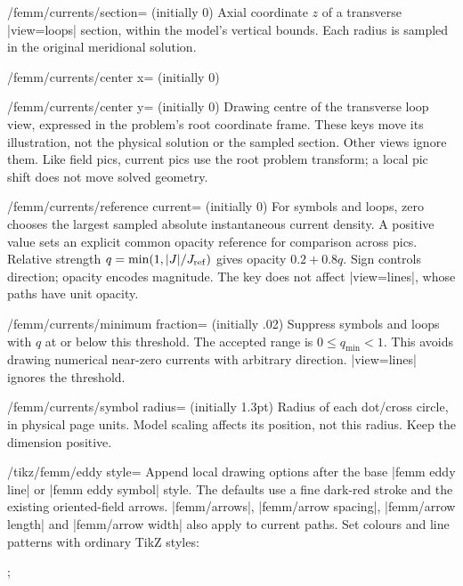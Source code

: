\begin{key}{/femm/currents/section= (initially 0)}
Axial coordinate $z$ of a transverse |view=loops| section, within the model's
vertical bounds. Each radius is sampled in the original meridional solution.
\end{key}
\begin{key}{/femm/currents/center x= (initially 0)}
\end{key}
\begin{key}{/femm/currents/center y= (initially 0)}
Drawing centre of the transverse loop view, expressed in the problem's root
coordinate frame. These keys move its illustration, not the physical solution
or the sampled section. Other views ignore them. Like field pics, current pics
use the root problem transform; a local pic shift does not move solved geometry.
\end{key}
\begin{key}{/femm/currents/reference current= (initially 0)}
For symbols and loops, zero chooses the largest sampled absolute instantaneous
current density. A positive value sets an explicit common opacity reference
for comparison across pics. Relative strength $q=\min(1,|J|/J_{\rm ref})$
gives opacity $0.2+0.8q$. Sign controls direction; opacity encodes magnitude.
The key does not affect |view=lines|, whose paths have unit opacity.
\end{key}
\begin{key}{/femm/currents/minimum fraction= (initially .02)}
Suppress symbols and loops with $q$ at or below this threshold. The accepted
range is $0\leq q_{\min}<1$. This avoids drawing numerical near-zero currents
with arbitrary direction. |view=lines| ignores the threshold.
\end{key}
\begin{key}{/femm/currents/symbol radius= (initially 1.3pt)}
Radius of each dot/cross circle, in physical page units. Model scaling affects
its position, not this radius. Keep the dimension positive.
\end{key}
\begin{key}{/tikz/femm/eddy style=}
Append local drawing options after the base |femm eddy line| or
|femm eddy symbol| style. The defaults use a fine dark-red stroke and the
existing oriented-field arrows. |femm/arrows|, |femm/arrow spacing|,
|femm/arrow length| and |femm/arrow width| also apply to current paths.
Set colours and line patterns with ordinary TikZ styles:
\begin{codeexample}
;
\end{codeexample}
\end{key}


